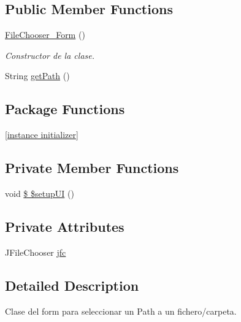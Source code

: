 \subsection*{Public Member Functions}
\begin{DoxyCompactItemize}
\item 
\hyperlink{classpresentacion_1_1form_1_1FileChooser__Form_abcd4d671f55d23cf9e0f2488a80b62cb}{File\+Chooser\+\_\+\+Form} ()
\begin{DoxyCompactList}\small\item\em Constructor de la clase. \end{DoxyCompactList}\item 
String \hyperlink{classpresentacion_1_1form_1_1FileChooser__Form_a599510439b2d28102d3b34f589919500}{get\+Path} ()
\end{DoxyCompactItemize}
\subsection*{Package Functions}
\begin{DoxyCompactItemize}
\item 
\hyperlink{classpresentacion_1_1form_1_1FileChooser__Form_a8d945fc06608ce6b2d4e49318b9c7b41}{\mbox{[}instance initializer\mbox{]}}
\end{DoxyCompactItemize}
\subsection*{Private Member Functions}
\begin{DoxyCompactItemize}
\item 
void \hyperlink{classpresentacion_1_1form_1_1FileChooser__Form_ab96ac21c9d7b860368a206f36f6ec4fb}{\$ \$setup\+UI} ()
\end{DoxyCompactItemize}
\subsection*{Private Attributes}
\begin{DoxyCompactItemize}
\item 
J\+File\+Chooser \hyperlink{classpresentacion_1_1form_1_1FileChooser__Form_a6fc55a912c266f0379aab09209dd858c}{jfc}
\end{DoxyCompactItemize}


\subsection{Detailed Description}
Clase del form para seleccionar un Path a un fichero/carpeta. 

